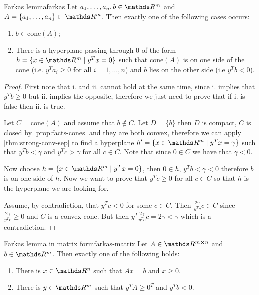\documentclass[12pt]{extarticle}
\begin{document}
\begin{theorem}{Farkas lemma}{farkas}
	Let $a_1, \dots, a_n, b \in \R^m$ and $A = \{a_1, \dots, a_n\} \subset \R^m$.
	Then exactly one of the following cases occurs:
	\begin{enumerate}[label=\roman*.]
		\item $b \in \mathrm{cone}(A)$;
		\item There is a hyperplane passing through $0$ of the form $h = \{x \in \R^m \mid y^Tx = 0\}$
		      such that $\mathrm{cone}(A)$ is on one side of the cone
		      (i.e. $y^T a_i \geq 0$ for all $i = 1, \dots, n$) and $b$ lies on the other side
		      (i.e $y^T b < 0$).
	\end{enumerate}
\end{theorem}

\begin{proof}
	First note that i. and ii. cannot hold at the same time, since i. implies that $y^T b \geq 0$
	but ii. implies the opposite, therefore we just need to prove that
	if i. is false then ii. is true.

	Let $C = \mathrm{cone}(A)$ and assume that $b \notin C$.
	Let $D = \{b\}$ then $D$ is compact, $C$ is closed by \cref{prop:facts-cones} and they are both
	convex, therefore we can apply \cref{thm:strong-conv-sep} to find a hyperplane
	$h' = \{ x \in \R^m \mid y^T x = \gamma\}$ such that $y^T b < \gamma$ and $y^T c > \gamma$
	for all $c \in C$. Note that since $0 \in C$ we have that $\gamma < 0$.

	Now choose $h = \{ x \in \R^m \mid y^T x = 0\}$, then $0 \in h$, $y^T b < \gamma < 0$
	therefore $b$ is on one side of $h$.
	Now we want to prove that $y^Tc \geq 0$ for all $c \in C$ so that $h$ is the hyperplane we are
	looking for.

	Assume, by contradiction, that $y^T c < 0$ for some $c \in C$.
	Then $\frac{2 \gamma}{y^T c} c \in C$ since $\frac{2 \gamma}{y^T c} \geq 0$ and
	$C$ is a convex cone.
	But then $y^T \frac{2 \gamma}{y^T c} c = 2 \gamma < \gamma$ which is a contradiction.
\end{proof}

\begin{corollary}{Farkas lemma in matrix form}{farkas-matrix}
	Let $A \in \R^{m \cross n}$ and $b \in \R^m$.
	Then exactly one of the following holds:
	\begin{enumerate}[label=\roman*.]
		\item There is $x \in \R^n$ such that $Ax = b$ and $x \geq 0$.
		\item There is $y \in \R^m$ such that $y^T A \geq 0^T$ and $y^T b < 0$.
	\end{enumerate}
\end{corollary}
\end{document}
